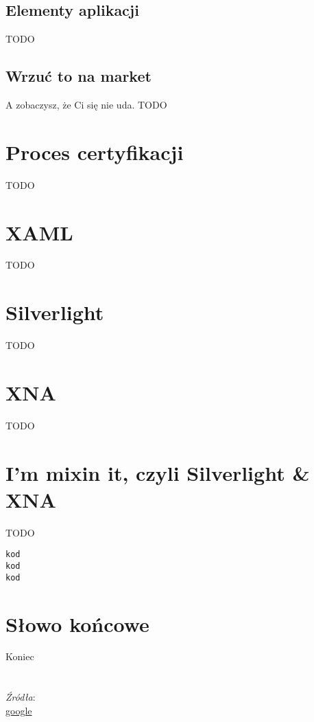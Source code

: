 \documentclass[12pt, a4paper]{article}
\begin{document}
\subsection{Elementy aplikacji}
TODO

\subsection{Wrzuć to na market}
A zobaczysz, że Ci się nie uda.
TODO

\section{Proces certyfikacji}
TODO

\section{XAML}
TODO

\section{Silverlight}
TODO

\section{XNA}
TODO

\section{I'm mixin it, czyli Silverlight \& XNA}
TODO

\begin{lstlisting}
kod
kod
kod
\end{lstlisting} 

\section{Słowo końcowe}
Koniec
\\\\\\
\emph{Źródła}:\\
\href{http://www.google.pl}{google}\\
\end{document}
